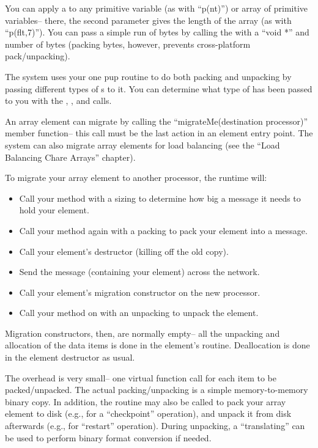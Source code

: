 You can apply a  to any primitive variable
(as with ``p(nt)'') or array of primitive variables-- there,
the second parameter gives the length of the array (as with
``p(flt,7)'').  You can pass a simple run of bytes 
by calling the  with a ``void *'' and number of bytes
(packing bytes, however, prevents cross-platform pack/unpacking).

The system uses your one pup routine to do both packing and
unpacking by passing different types of s to it. 
You can determine what type of  has been passed to you 
with the , , and  calls.

An array element can migrate by calling the ``migrateMe(destination
processor)'' member function-- this call must be the last action
in an element entry point.  The system can also migrate array elements
for load balancing (see the ``Load Balancing Chare Arrays'' chapter).

To migrate your array element to another processor, the \charmpp 
runtime will:

\begin{itemize}
\item Call your  method with a sizing  to determine how 
big a message it needs to hold your element.
\item Call your  method again with a packing  to pack 
your element into a message.
\item Call your element's destructor (killing off the old copy).
\item Send the message (containing your element) across the network.
\item Call your element's migration constructor on the new processor.
\item Call your  method on with an unpacking  to unpack 
the element.
\end{itemize}

Migration constructors, then, are normally empty-- all the
unpacking and allocation of the data items is done in the 
element's  routine.  Deallocation is done in the
element destructor as usual.

The  overhead is very small-- one 
virtual function call for each item to be packed/unpacked.
The actual packing/unpacking is a simple memory-to-memory 
binary copy.  In addition, the  routine may also be called to 
pack your array 
element to disk (e.g., for a ``checkpoint'' operation), and unpack 
it from disk afterwards (e.g., for ``restart'' operation).  
During unpacking, a ``translating''  can be used to perform binary
format conversion if needed.

